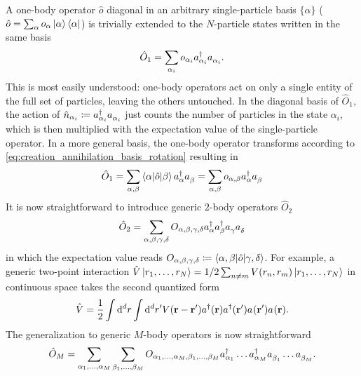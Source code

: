 A one-body operator $\hat o$ diagonal in an arbitrary single-particle basis $\{\alpha\}$ ($\hat o = \sum_\alpha o_{\alpha}\ket{\alpha}\bra{\alpha}$) is trivially extended to the $N$-particle states written in the same basis
\begin{align}
    \hat O_1
    = \sum_{\alpha_i} o_{\alpha_i}a^\dag_{\alpha_i}a^\pdag_{\alpha_i}.
\end{align}
This is most easily understood: one-body operators act on only a single entity of the full set of particles, leaving the others untouched.
In the diagonal basis of $\hat O_1$, the action of $\hat n_{\alpha_i}\coloneqq a^\dag_{\alpha_i}a^\pdag_{\alpha_i}$ just counts the number of particles in the state $\alpha_i$, which is then multiplied with the expectation value of the single-particle operator.
In a more general basis, the one-body operator transforms according to \cref{eq:creation_annihilation_basis_rotation} resulting in
\begin{align}
    \hat O_1 = \sum_{\alpha, \beta}\braket{\alpha | \hat o | \beta} a^\dag_\alpha a^\pdag_\beta = \sum_{\alpha,\beta}o_{\alpha,\beta}a^\dag_\alpha a^\pdag_\beta
    \label{eq:one_body_operator}
\end{align}
It is now straightforward to introduce generic $2$-body operators $\hat O_2$
\begin{align}
    \hat O_2 = \sum_{\alpha,\beta,\gamma,\delta}O_{\alpha,\beta,\gamma,\delta}a^\dag_\alpha a^\dag_\beta a^\pdag_\gamma a^\pdag_\delta
\end{align}
in which the expectation value reads $O_{\alpha,\beta,\gamma,\delta}\coloneqq \braket{\alpha,\beta | \hat o | \gamma,\delta}$.
For example, a generic two-point interaction $\hat V\ket{r_1,\dots,r_N}=1/2\sum_{n\neq m}V(r_n,r_m)\ket{r_1,\dots,r_N}$ in continuous space takes the second quantized form
\begin{align}
    \hat V = \frac12\int{\rd^d r}\int{\rd^d r'}V({\bf r}-{\bf r'})a^\dag({\bf r})a^\dag({\bf r'})a^\pdag({\bf r'})a^\pdag({\bf r}).
    \label{eq:two_point_interaction}
\end{align}
The generalization to generic $M$-body operators is now straightforward
\begin{align}
    \hat O_M = \sum_{\alpha_1,\dots,\alpha_M}\sum_{\beta_1,\dots,\beta_M}O_{\alpha_1,\dots,\alpha_M,\beta_1,\dots,\beta_M}a^\dag_{\alpha_1}\dots a^\dag_{\alpha_M}a^\pdag_{\beta_1}\dots a^\pdag_{\beta_M}.
\end{align}
%
%
